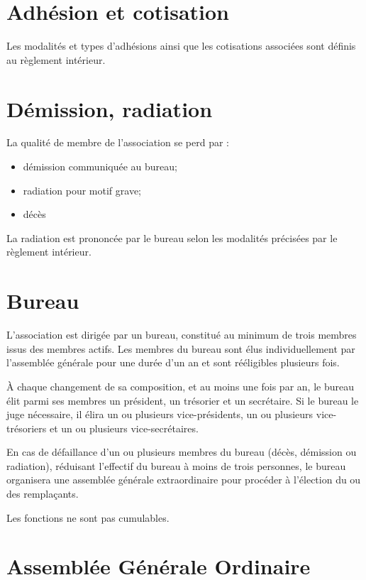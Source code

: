 \documentclass[a4paper, 11pt]{article}
\begin{document}
\section{Adhésion et cotisation} %

Les modalités et types d'adhésions ainsi que les cotisations associées sont définis au règlement intérieur.


\section{Démission, radiation} %

La qualité de membre de l'association se perd par :

\begin{itemize}
    \item démission communiquée au bureau;
    \item radiation pour motif grave;
    \item décès
\end{itemize}

La radiation est prononcée par le bureau selon les modalités précisées par le règlement intérieur.


\section{Bureau} %

L'association est dirigée par un bureau, constitué au minimum de trois membres issus des membres actifs.
Les membres du bureau sont élus individuellement par l'assemblée générale pour une durée d'un an et sont
rééligibles plusieurs fois.

À chaque changement de sa composition, et au moins une fois par an, le bureau élit parmi ses membres un président, un
trésorier et un secrétaire.
Si le bureau le juge nécessaire, il élira un ou plusieurs vice-présidents, un ou plusieurs vice-trésoriers et un ou
plusieurs vice-secrétaires.


En cas de défaillance d'un ou plusieurs membres du bureau (décès, démission ou radiation), réduisant l'effectif du
bureau à moins de trois personnes, le bureau organisera une assemblée générale extraordinaire pour procéder à l'élection
du ou des remplaçants.

Les fonctions ne sont pas cumulables.


\section{Assemblée Générale Ordinaire} %
\end{document}
